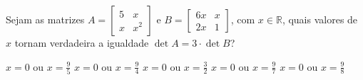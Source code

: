 Sejam as matrizes $A = \left[ \begin{array}{cc}
5 & x \\
x & x^2
\end{array} \right]$ e $B = \left[ \begin{array}{cc}
6x & x \\
2x & 1
\end{array} \right]$, com $x\in\mathbb{R}$, quais valores de $x$ tornam verdadeira a igualdade $\det A=3\cdot\det B$?

$x=0$ ou $x=\frac{9}{5}$
$x=0$ ou $x=\frac{9}{4}$
$x=0$ ou $x=\frac{3}{2}$
$x=0$ ou $x=\frac{9}{7}$
$x=0$ ou $x=\frac{9}{8}$


